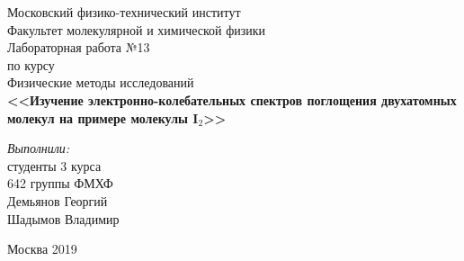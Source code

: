 \begin{titlepage}
\begin{center} 
 
\large Московский физико-технический институт\\
Факультет молекулярной и химической физики\\
\vspace{7cm}
\Large Лабораторная работа №13 \\по курсу \\ Физические методы исследований\\
\textbf{\Huge <<Изучение электронно-колебательных спектров поглощения двухатомных молекул на примере молекулы I$_2$>>}\\
\end{center} 

\vspace{7.5cm}
{\par \raggedleft \large \emph{Выполнили:}\\ студенты 3 курса\\ 642 группы ФМХФ\\ Демьянов Георгий\\ Шадымов Владимир \par}
\begin{center}
\vfill Москва 2019
\end{center}
\end{titlepage}
\newpage
\setcounter{page}{2}